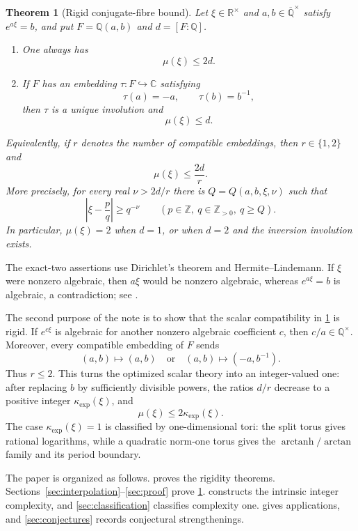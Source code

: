 \documentclass[11pt]{article}
\newcommand{\CC}{\mathbb C}
\newcommand{\RR}{\mathbb R}
\newcommand{\QQ}{\mathbb Q}
\newcommand{\ZZ}{\mathbb Z}
\newcommand{\Qbar}{\overline{\mathbb Q}}
\DeclareMathOperator{\arctanh}{arctanh}
\newtheorem{theorem}{Theorem}[section]
\theoremstyle{definition}
\theoremstyle{remark}
\numberwithin{equation}{section}
\begin{document}
\begin{theorem}[Rigid conjugate-fibre bound]\label{thm:main}
Let $\xi\in\RR^\times$ and $a,b\in\Qbar^\times$ satisfy $e^{a\xi}=b$,
and put $F=\QQ(a,b)$ and $d=[F:\QQ]$.
\begin{enumerate}[label=\textup{(\roman*)}]
\item One always has
\[
 \boxed{\mu(\xi)\le2d.}
\]
\item If $F$ has an embedding $\tau:F\hookrightarrow\CC$ satisfying
\[
 \tau(a)=-a,
 \qquad
 \tau(b)=b^{-1},
\]
then $\tau$ is a unique involution and
\[
 \boxed{\mu(\xi)\le d.}
\]
\end{enumerate}
Equivalently, if $r$ denotes the number of compatible embeddings, then
$r\in\{1,2\}$ and
\[
 \boxed{\mu(\xi)\le\frac{2d}{r}.}
\]
More precisely, for every real $\nu>2d/r$ there is
$Q=Q(a,b,\xi,\nu)$ such that
\[
  \left|\xi-\frac pq\right|\ge q^{-\nu}
  \qquad(p\in\ZZ,\ q\in\ZZ_{>0},\ q\ge Q).
\]
In particular, $\mu(\xi)=2$ when $d=1$, or when $d=2$ and the inversion
involution exists.
\end{theorem}

The exact-two assertions use Dirichlet's theorem and
Hermite--Lindemann.  If $\xi$ were nonzero algebraic, then $a\xi$ would
be nonzero algebraic, whereas $e^{a\xi}=b$ is algebraic, a contradiction;
see \cite[Chapter~1]{Baker1975}.

The second purpose of the note is to show that the scalar compatibility
in \cref{thm:main} is rigid.  If $e^{c\xi}$ is algebraic for another
nonzero algebraic coefficient $c$, then $c/a\in\QQ^\times$.  Moreover,
every compatible embedding of $F$ sends
\[
 (a,b)\longmapsto(a,b)
 \quad\text{or}\quad
 (a,b)\longmapsto(-a,b^{-1}).
\]
Thus $r\le2$.  This turns the optimized scalar theory into an
integer-valued one: after replacing $b$ by sufficiently divisible
powers, the ratios $d/r$ decrease to a positive integer
$\kappa_{\exp}(\xi)$, and
\[
 \mu(\xi)\le2\kappa_{\exp}(\xi).
\]
The case $\kappa_{\exp}(\xi)=1$ is classified by one-dimensional tori:
the split torus gives rational logarithms, while a quadratic norm-one
torus gives the $\arctanh/\arctan$ family and its period boundary.

The paper is organized as follows.   proves the
rigidity theorems.  Sections~\ref{sec:interpolation}--\ref{sec:proof}
prove \cref{thm:main}.   constructs the intrinsic
integer complexity, and \cref{sec:classification} classifies complexity
one.   gives applications, and
\cref{sec:conjectures} records conjectural strengthenings.
\end{document}
